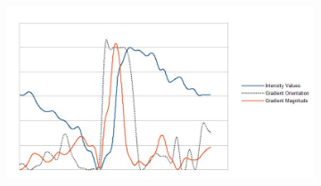 \begin{figure}[htbp]
\begin{subfigure}[b]{0.1\textwidth}
		\caption{}
		\label{fig:kalahari_patch_arrow}
	\end{subfigure}
	\begin{subfigure}[b]{0.6\textwidth}
		\centering
		\includegraphics[width=\textwidth]{figures/kalahari_patch_plot}
		\caption{}
		\label{fig:kalahari_patch_plot}
	\end{subfigure}
	

\end{figure}
